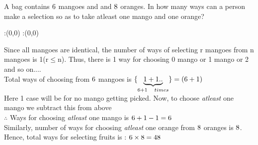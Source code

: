 



\question[5] A bag contains $6$ mangoes and and $8$ oranges. In how many ways can a person make a selection so as to take atleast one mango and one orange?  


\watchout

\ifprintanswers
  \begin{marginfigure}
      :(0,0)
      :(0,0)
    \figdrawbegin{}
      \figdrawline [100,101]
    \figdrawend
    \figvisu{\figBoxA}{}{%
    }
    \centerline{\box\figBoxA}
  \end{marginfigure}
\fi 

\begin{solution}[\halfpage]
Since all mangoes are identical, the number of ways of selecting r mangoes from n mangoes is 1(r$\leq$n). Thus, there is 1 way for choosing 0 mango or 1 mango or 2 and so on....\\
Total ways of choosing from $6$ mangoes is $\lbrace \underbrace{1+1..}_{6 +1 \quad times} \rbrace = (6 +1)$ \\
Here 1 case will be for no mango getting picked. Now, to choose \textit{atleast} one mango we subtract this from above\\
$\therefore $ Ways for choosing \textit{atleast} one mango is $6 + 1 -1 = 6$\\
Similarly, number of ways for choosing \textit{atleast} one orange from $8$ oranges is $8  $.\\
Hence, total ways for selecting fruits is : $6 \times 8 = 48$     
\end{solution}


